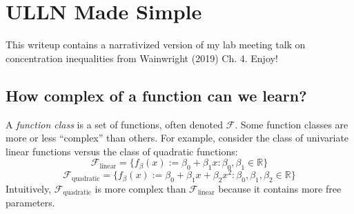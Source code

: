 \documentclass[
]{article}
\author{}
\date{}
\begin{document}
\hypertarget{ulln-made-simple}{%
\section{ULLN Made Simple}\label{ulln-made-simple}}

This writeup contains a narrativized version of my lab meeting talk on
concentration inequalities from Wainwright (2019) Ch. 4. Enjoy!

\hypertarget{how-complex-of-a-function-can-we-learn}{%
\subsection{How complex of a function can we
learn?}\label{how-complex-of-a-function-can-we-learn}}

A \emph{function class} is a set of functions, often denoted
\(\mathscr{F}\). Some function classes are more or less ``complex'' than
others. For example, consider the class of univariate linear functions
versus the class of quadratic functions:
\[\mathscr{F}_{\text{linear}} = \{f_\beta(x) := \beta_0 + \beta_1 x : \beta_0, \beta_1 \in \mathbb{R}\}\]
\[\mathscr{F}_{\text{quadratic}} = \{f_\beta(x) := \beta_0 + \beta_1 x + \beta_2 x^2 : \beta_0, \beta_1, \beta_2 \in \mathbb{R}\}\]
Intuitively, \(\mathscr{F}_{\text{quadratic}}\) is more complex than
\(\mathcal{F}_{\text{linear}}\) because it contains more free
parameters.
\end{document}
